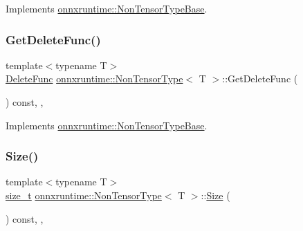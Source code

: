 Implements \mbox{\hyperlink{classonnxruntime_1_1NonTensorTypeBase_a770380dc6cea2aeaa02ab04c401f3018}{onnxruntime\+::\+Non\+Tensor\+Type\+Base}}.

\mbox{\label{classonnxruntime_1_1NonTensorType_a5220a1a535891fcb0079befd7391062f}} 
\subsubsection{\texorpdfstring{Get\+Delete\+Func()}{GetDeleteFunc()}}
{\footnotesize\ttfamily template$<$typename T$>$ \\
\mbox{\hyperlink{namespaceonnxruntime_a8dcea0e1aa8476e3d09d5a44a0ca4516}{Delete\+Func}} \mbox{\hyperlink{classonnxruntime_1_1NonTensorType}{onnxruntime\+::\+Non\+Tensor\+Type}}$<$ T $>$\+::Get\+Delete\+Func (\begin{DoxyParamCaption}{ }\end{DoxyParamCaption}) const\hspace{0.3cm}{\ttfamily [inline]}, {\ttfamily [override]}, {\ttfamily [virtual]}}



Implements \mbox{\hyperlink{classonnxruntime_1_1NonTensorTypeBase_a09fc84f1ff38aa3bc4752a7560fcf902}{onnxruntime\+::\+Non\+Tensor\+Type\+Base}}.

\mbox{\label{classonnxruntime_1_1NonTensorType_a514c297618cdb975d4f98a5b47321086}} 
\subsubsection{\texorpdfstring{Size()}{Size()}}
{\footnotesize\ttfamily template$<$typename T$>$ \\
\mbox{\hyperlink{mlasi_8h_a503efbc1c6e50825320ad909366b78ab}{size\+\_\+t}} \mbox{\hyperlink{classonnxruntime_1_1NonTensorType}{onnxruntime\+::\+Non\+Tensor\+Type}}$<$ T $>$\+::\mbox{\hyperlink{classonnxruntime_1_1Size}{Size}} (\begin{DoxyParamCaption}{ }\end{DoxyParamCaption}) const\hspace{0.3cm}{\ttfamily [inline]}, {\ttfamily [override]}, {\ttfamily [virtual]}}



